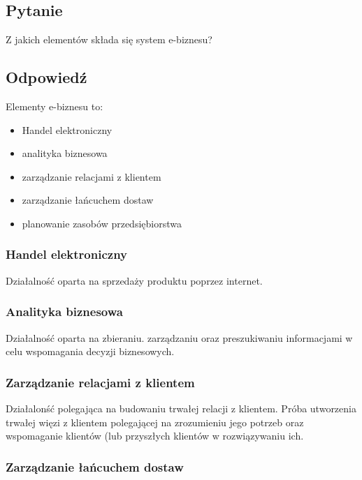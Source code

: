 \documentclass[paper=a4, fontsize=11pt]{scrartcl} %
\numberwithin{equation}{section} %
\numberwithin{figure}{section} %
\numberwithin{table}{section} %
\begin{document}
\subsection {Pytanie}

Z jakich elementów składa się system e-biznesu?

\subsection  {Odpowiedź}

Elementy e-biznesu to:

\begin {itemize}
  \item Handel elektroniczny
  \item analityka biznesowa
  \item zarządzanie relacjami z klientem
  \item zarządzanie łańcuchem dostaw
  \item planowanie zasobów przedsiębiorstwa
\end {itemize}

\subsubsection {Handel elektroniczny} 

Działalność oparta na sprzedaży produktu poprzez internet.

\subsubsection {Analityka biznesowa}

Działalność oparta na zbieraniu. zarządzaniu oraz preszukiwaniu informacjami w celu wspomagania decyzji biznesowych.

\subsubsection {Zarządzanie relacjami z klientem}

Działalonść polegająca na budowaniu trwałej relacji z klientem. Próba utworzenia trwałej więzi z klientem polegającej na zrozumieniu jego potrzeb oraz wspomaganie klientów (lub przyszłych
klientów w rozwiązywaniu ich.

\subsubsection {Zarządzanie łańcuchem dostaw}
\end{document}
